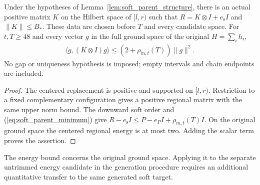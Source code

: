 \begin{lemma}
    \label{lem:native_soft_parent_energy}
    \leanok
    Under the hypotheses of Lemma~\ref{lem:soft_parent_structure}, there
    is an actual positive matrix $K$ on the Hilbert space of $[l,r)$
    such that $R=K\otimes I+e_{\mathrm s}I$ and $\|K\|\le B_*$.
    These data are chosen before $T$ and every candidate space. For
    $t,T\ge48$ and every vector $g$ in the full ground space of the
    original $H=\sum_i h_i$,
    \begin{align}
        \langle g,(K\otimes I)g\rangle
        \le(2+\rho_{m,t}(T))\|g\|^2.
    \end{align}
    No gap or uniqueness hypothesis is imposed; empty intervals and
    chain endpoints are included.
\end{lemma}
\begin{proof}\leanok
    The centered replacement is positive and supported on $[l,r)$.
    Restriction to a fixed complementary configuration gives a positive
    regional matrix with the same upper norm bound. The downward soft
    order and (\ref{eq:soft_parent_minimum}) give
    $R-e_{\mathrm s}I\le P-e_PI+\rho_{m,t}(T)I$.
    On the original ground space the centered regional energy is at
    most two. Adding the scalar term proves the assertion.
\end{proof}

The energy bound concerns the original ground space. Applying it to the
separate untrimmed energy candidate in the generation procedure requires
an additional quantitative transfer to the same generated soft target.

